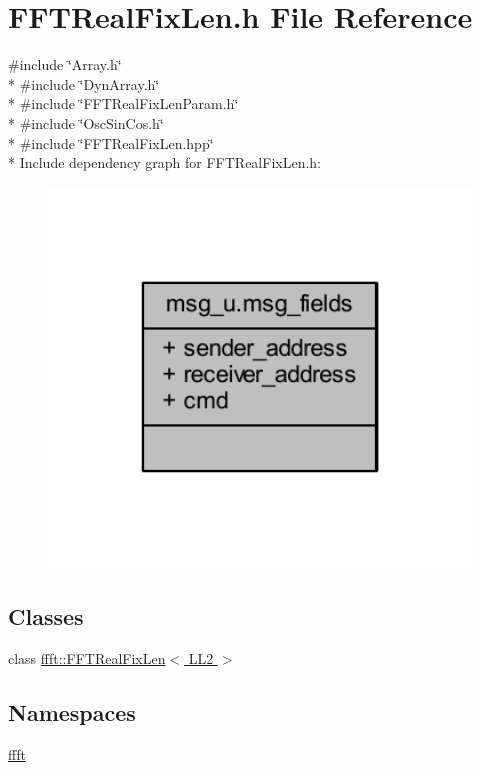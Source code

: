 \hypertarget{a00097}{\section{F\+F\+T\+Real\+Fix\+Len.\+h File Reference}
\label{a00097}
}
{\ttfamily \#include \char`\"{}Array.\+h\char`\"{}}\\*
{\ttfamily \#include \char`\"{}Dyn\+Array.\+h\char`\"{}}\\*
{\ttfamily \#include \char`\"{}F\+F\+T\+Real\+Fix\+Len\+Param.\+h\char`\"{}}\\*
{\ttfamily \#include \char`\"{}Osc\+Sin\+Cos.\+h\char`\"{}}\\*
{\ttfamily \#include \char`\"{}F\+F\+T\+Real\+Fix\+Len.\+hpp\char`\"{}}\\*
Include dependency graph for F\+F\+T\+Real\+Fix\+Len.\+h\+:
\nopagebreak
\begin{figure}[H]
\begin{center}
\leavevmode
\includegraphics[width=350pt]{d0/d2f/a00259}
\end{center}
\end{figure}
\subsection*{Classes}
\begin{DoxyCompactItemize}
\item 
class \hyperlink{a00011}{ffft\+::\+F\+F\+T\+Real\+Fix\+Len$<$ L\+L2 $>$}
\end{DoxyCompactItemize}
\subsection*{Namespaces}
\begin{DoxyCompactItemize}
\item 
 \hyperlink{a00142}{ffft}
\end{DoxyCompactItemize}
